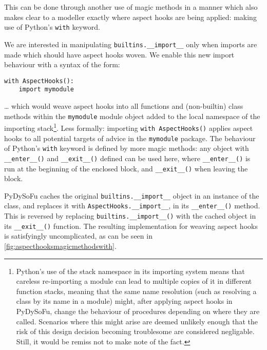 
This can be done through another use of magic methods in a manner which also
makes clear to a modeller exactly where aspect hooks are being applied: making
use of Python's \lstinline{with} keyword.


We are interested in manipulating \lstinline{builtins.__import__} only when
imports are made which should have aspect hooks woven. We enable this new import
behaviour with a syntax of the form:

\begin{lstlisting}
with AspectHooks():
    import mymodule
\end{lstlisting}

\ldots{} which would weave aspect hooks into all functions and (non-builtin)
class methods within the \lstinline{mymodule} module object added to the local
namespace of the importing stack\footnote{Python's use of the stack namespace in
its importing system means that careless re-importing a module can lead to
multiple copies of it in different function stacks, meaning that the same name
resolution (such as resolving a class by its name in a module) might, after
applying aspect hooks in PyDySoFu, change the behaviour of procedures depending
on where they are called. Scenarios where this might arise are deemed unlikely
enough that the risk of this design decision becoming troublesome are considered
negligable. Still, it would be remiss not to make note of the fact.}. Less
formally: importing \lstinline{with AspectHooks()} applies aspect hooks to all
potential targets of advice in the \lstinline{mymodule} package. The behaviour
of Python's \lstinline{with} keyword is defined by more magic methods: any
object with \lstinline{__enter__()} and \lstinline{__exit__()} defined can be
used here, where \lstinline{__enter__()} is run at the beginning of the enclosed
block, and \lstinline{__exit__()} when leaving the block.

PyDySoFu caches the original \lstinline{builtins.__import__} object in an
instance of the class, and replaces it with \lstinline{AspectHooks.__import__},
in its \lstinline{__enter__()} method. This is reversed by replacing
\lstinline{builtins.__import__()} with the cached object in its
\lstinline{__exit__()} function. The resulting implementation for weaving aspect
hooks is satisfyingly uncomplicated, as can be seen in \cref{fig:aspecthooksmagicmethodswith}.

